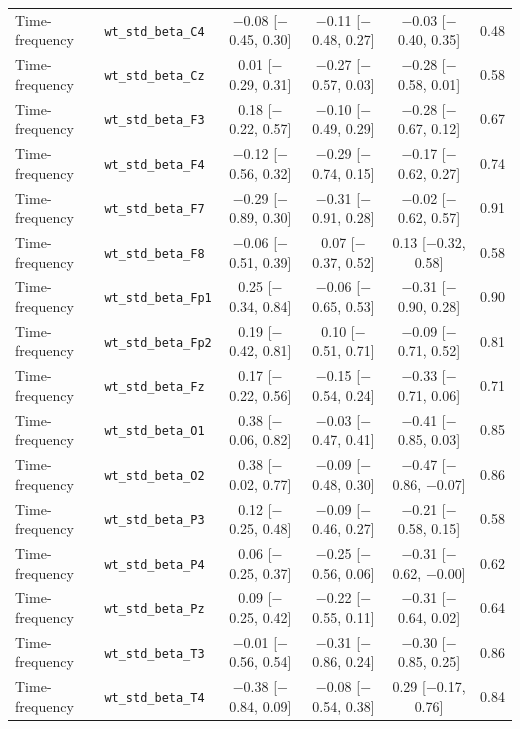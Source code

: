 {\begin{longtable}{llcccc}
Time-frequency & \texttt{wt\_std\_beta\_C4} & $-$0.08 [$-$0.45, 0.30] & $-$0.11 [$-$0.48, 0.27] & $-$0.03 [$-$0.40, 0.35] & 0.48 \\
Time-frequency & \texttt{wt\_std\_beta\_Cz} & 0.01 [$-$0.29, 0.31] & $-$0.27 [$-$0.57, 0.03] & $-$0.28 [$-$0.58, 0.01] & 0.58 \\
Time-frequency & \texttt{wt\_std\_beta\_F3} & 0.18 [$-$0.22, 0.57] & $-$0.10 [$-$0.49, 0.29] & $-$0.28 [$-$0.67, 0.12] & 0.67 \\
Time-frequency & \texttt{wt\_std\_beta\_F4} & $-$0.12 [$-$0.56, 0.32] & $-$0.29 [$-$0.74, 0.15] & $-$0.17 [$-$0.62, 0.27] & 0.74 \\
Time-frequency & \texttt{wt\_std\_beta\_F7} & $-$0.29 [$-$0.89, 0.30] & $-$0.31 [$-$0.91, 0.28] & $-$0.02 [$-$0.62, 0.57] & 0.91 \\
Time-frequency & \texttt{wt\_std\_beta\_F8} & $-$0.06 [$-$0.51, 0.39] & 0.07 [$-$0.37, 0.52] & 0.13 [$-$0.32, 0.58] & 0.58 \\
Time-frequency & \texttt{wt\_std\_beta\_Fp1} & 0.25 [$-$0.34, 0.84] & $-$0.06 [$-$0.65, 0.53] & $-$0.31 [$-$0.90, 0.28] & 0.90 \\
Time-frequency & \texttt{wt\_std\_beta\_Fp2} & 0.19 [$-$0.42, 0.81] & 0.10 [$-$0.51, 0.71] & $-$0.09 [$-$0.71, 0.52] & 0.81 \\
Time-frequency & \texttt{wt\_std\_beta\_Fz} & 0.17 [$-$0.22, 0.56] & $-$0.15 [$-$0.54, 0.24] & $-$0.33 [$-$0.71, 0.06] & 0.71 \\
Time-frequency & \texttt{wt\_std\_beta\_O1} & 0.38 [$-$0.06, 0.82] & $-$0.03 [$-$0.47, 0.41] & $-$0.41 [$-$0.85, 0.03] & 0.85 \\
Time-frequency & \texttt{wt\_std\_beta\_O2} & 0.38 [$-$0.02, 0.77] & $-$0.09 [$-$0.48, 0.30] & $-$0.47 [$-$0.86, $-$0.07] & 0.86 \\
Time-frequency & \texttt{wt\_std\_beta\_P3} & 0.12 [$-$0.25, 0.48] & $-$0.09 [$-$0.46, 0.27] & $-$0.21 [$-$0.58, 0.15] & 0.58 \\
Time-frequency & \texttt{wt\_std\_beta\_P4} & 0.06 [$-$0.25, 0.37] & $-$0.25 [$-$0.56, 0.06] & $-$0.31 [$-$0.62, $-$0.00] & 0.62 \\
Time-frequency & \texttt{wt\_std\_beta\_Pz} & 0.09 [$-$0.25, 0.42] & $-$0.22 [$-$0.55, 0.11] & $-$0.31 [$-$0.64, 0.02] & 0.64 \\
Time-frequency & \texttt{wt\_std\_beta\_T3} & $-$0.01 [$-$0.56, 0.54] & $-$0.31 [$-$0.86, 0.24] & $-$0.30 [$-$0.85, 0.25] & 0.86 \\
Time-frequency & \texttt{wt\_std\_beta\_T4} & $-$0.38 [$-$0.84, 0.09] & $-$0.08 [$-$0.54, 0.38] & 0.29 [$-$0.17, 0.76] & 0.84 \\

\end{longtable}}

